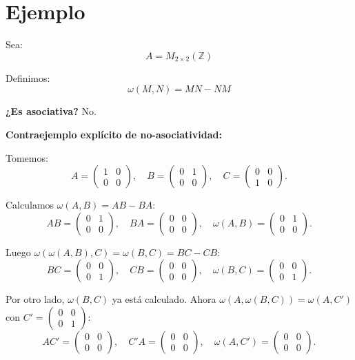 \documentclass[12pt]{article}
\begin{document}
\section*{Ejemplo}

Sea:
\[
A=M_{2\times2}(\mathbb{Z})
\]

Definimos:
\[
\omega(M,N)=MN-NM
\]

\textbf{¿Es asociativa?} No.

\begin{tcolorbox}[iabox]
\textbf{Contraejemplo explícito de no-asociatividad:}

Tomemos:
\[
  A=\begin{pmatrix}1&0\\0&0\end{pmatrix},\quad
  B=\begin{pmatrix}0&1\\0&0\end{pmatrix},\quad
  C=\begin{pmatrix}0&0\\1&0\end{pmatrix}.
\]

Calculamos $\omega(A,B)=AB-BA$:
\[
  AB=\begin{pmatrix}0&1\\0&0\end{pmatrix},\quad
  BA=\begin{pmatrix}0&0\\0&0\end{pmatrix},\quad
  \omega(A,B)=\begin{pmatrix}0&1\\0&0\end{pmatrix}.
\]

Luego $\omega(\omega(A,B),C)=\omega(B,C)=BC-CB$:
\[
  BC=\begin{pmatrix}0&0\\0&1\end{pmatrix},\quad
  CB=\begin{pmatrix}0&0\\0&0\end{pmatrix},\quad
  \omega(B,C)=\begin{pmatrix}0&0\\0&1\end{pmatrix}.
\]

Por otro lado, $\omega(B,C)$ ya está calculado. Ahora $\omega(A,\omega(B,C))=\omega(A,C')$ con $C'=\begin{pmatrix}0&0\\0&1\end{pmatrix}$:
\[
  AC'=\begin{pmatrix}0&0\\0&0\end{pmatrix},\quad
  C'A=\begin{pmatrix}0&0\\0&0\end{pmatrix},\quad
  \omega(A,C')=\begin{pmatrix}0&0\\0&0\end{pmatrix}.
\]


\end{tcolorbox}
\end{document}
